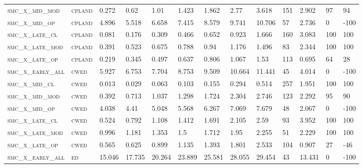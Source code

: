 \begin{landscape}
\begin{center}
\begin{footnotesize}
\begin{longtable}{lllllllllllll}
\textsc{smc\_x\_mid\_mod  } & \textsc{cpland    }   & 0.272    & 0.62     & 1.01     & 1.423    & 1.862    & 2.77     & 3.618    & 151 & 2.902    & 97  & 94     \\
\textsc{smc\_x\_mid\_op   } & \textsc{cpland    }   & 4.896    & 5.518    & 6.658    & 7.415    & 8.579    & 9.741    & 10.706   & 57  & 2.736    & 0   & -100   \\
\textsc{smc\_x\_late\_cl  } & \textsc{cpland    }   & 0.081    & 0.176    & 0.309    & 0.466    & 0.652    & 0.923    & 1.666    & 160 & 3.083    & 100 & 100    \\
\textsc{smc\_x\_late\_mod } & \textsc{cpland    }   & 0.391    & 0.523    & 0.675    & 0.788    & 0.94     & 1.176    & 1.496    & 83  & 2.344    & 100 & 100    \\
\textsc{smc\_x\_late\_op  } & \textsc{cpland    }   & 0.219    & 0.345    & 0.497    & 0.637    & 0.806    & 1.067    & 1.53     & 113 & 0.695    & 64  & 28     \\
\textsc{smc\_x\_early\_all} & \textsc{cwed      }   & 5.927    & 6.753    & 7.704    & 8.753    & 9.509    & 10.664   & 11.441   & 45  & 4.014    & 0   & -100   \\
\textsc{smc\_x\_mid\_cl   } & \textsc{cwed      }   & 0.013    & 0.029    & 0.063    & 0.103    & 0.155    & 0.294    & 0.514    & 257 & 1.951    & 100 & 100    \\
\textsc{smc\_x\_mid\_mod  } & \textsc{cwed      }   & 0.392    & 0.713    & 1.037    & 1.298    & 1.724    & 2.304    & 2.746    & 123 & 2.292    & 95  & 90     \\
\textsc{smc\_x\_mid\_op   } & \textsc{cwed      }   & 4.038    & 4.41     & 5.048    & 5.568    & 6.267    & 7.069    & 7.679    & 48  & 2.067    & 0   & -100   \\
\textsc{smc\_x\_late\_cl  } & \textsc{cwed      }   & 0.524    & 0.792    & 1.108    & 1.412    & 1.691    & 2.105    & 2.59     & 93  & 3.952    & 100 & 100    \\
\textsc{smc\_x\_late\_mod } & \textsc{cwed      }   & 0.996    & 1.181    & 1.353    & 1.5      & 1.712    & 1.95     & 2.255    & 51  & 2.229    & 100 & 100    \\
\textsc{smc\_x\_late\_op  } & \textsc{cwed      }   & 0.565    & 0.625    & 0.899    & 1.135    & 1.393    & 1.801    & 2.533    & 104 & 0.907    & 27  & -46    \\
\textsc{smc\_x\_early\_all} & \textsc{ed        }   & 15.046   & 17.735   & 20.264   & 23.889   & 25.581   & 28.055   & 29.454   & 43  & 13.431   & 0   & -100   \\

\end{longtable}
\end{footnotesize}
\end{center}
\end{landscape}
